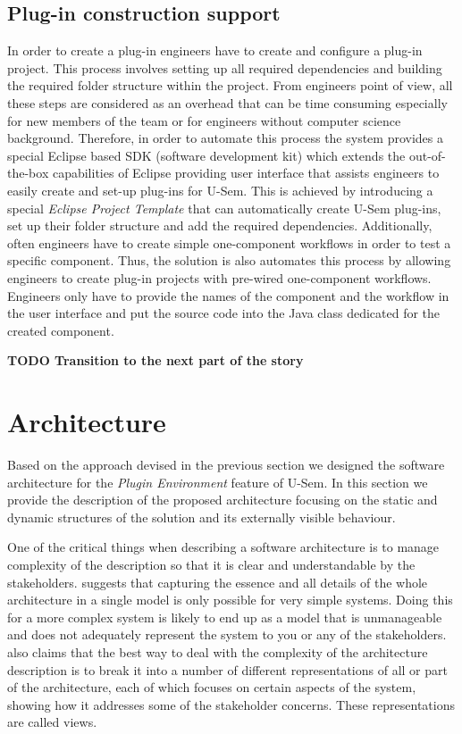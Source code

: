\subsection{Plug-in construction support}

In order to create a plug-in engineers have to create and configure a plug-in project. This process involves setting up all required dependencies and building the required folder structure within the project. From engineers point of view, all these steps are considered as an overhead that can be time consuming especially for new members of the team or for engineers without computer science background. Therefore, in order to automate this process the system provides a special Eclipse based SDK (software development kit) which extends the out-of-the-box capabilities of Eclipse providing user interface that assists engineers to easily create and set-up plug-ins for U-Sem. This is achieved by introducing a special \textit{Eclipse Project Template} \cite{silva2009practical} that can automatically create U-Sem plug-ins, set up their folder structure and add the required dependencies. Additionally, often engineers have to create simple one-component workflows in order to test a specific component. Thus, the solution is also automates this process by allowing engineers to create plug-in projects with pre-wired one-component workflows. Engineers only have to provide the names of the component and the workflow in the user interface and put the source code into the Java class dedicated for the created component. 

\textbf{TODO Transition to the next part of the story}

\section{Architecture}
\label{sec:architecturePlugin}

Based on the approach devised in the previous section we designed the software architecture for the \textit{Plugin Environment} feature of U-Sem. In this section we provide the description of the proposed architecture focusing on the static and dynamic structures of the solution and its externally visible behaviour.

One of the critical things when describing a software architecture is to manage complexity of the description so that it is clear and understandable by the stakeholders. \cite{rozanski2011software} suggests that capturing the essence and all details of the whole architecture in a single model is only possible for very simple systems. Doing this for a more complex system is likely to end up as a model that is unmanageable and does not adequately represent the system to you or any of the stakeholders. \cite{rozanski2011software} also claims that the best way to deal with the complexity of the architecture description is to break it into a number of different representations of all or part of the architecture, each of which focuses on certain aspects of the system, showing how it addresses some of the stakeholder concerns. These representations are called views.

